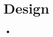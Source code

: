 \chapter{Design}\label{chapter:W13}
\begin{multicols}{2}\begin{itemize}[nosep,label={$\square$}]
\item\end{itemize}\end{multicols}
